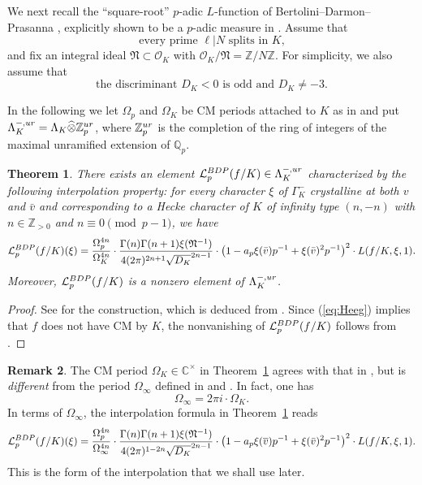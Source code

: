 \documentclass[a4paper,10pt]{amsart}
\numberwithin{equation}{section}
\numberwithin{equation}{section}
\theoremstyle{plain}
\newtheorem{thm}{Theorem}[subsection] %
\theoremstyle{definition}
\newtheorem{rmk}[thm]{Remark}
\theoremstyle{definition}
\theoremstyle{plain}
\theoremstyle{plain}
\theoremstyle{plain}
\theoremstyle{plain}
\newcommand{\Z}{\mathbb{Z}}
\newcommand{\Q}{\mathbb{Q}}
\newcommand{\C}{\mathbb{C}}
\newcommand{\Lcal}{\mathcal{L}}
\begin{document}
We next recall the ``square-root'' $p$-adic $L$-function of Bertolini--Darmon--Prasanna \cite{BDP}, explicitly shown to be a $p$-adic measure in \cite{cas-hsieh1}. Assume that 
\begin{equation}\label{eq:Heeg}
\textrm{every prime $\ell\vert N$ splits in $K$,}\tag{Heeg}
\end{equation}
and fix an integral ideal $\mathfrak{N}\subset\mathcal{O}_K$ with $\mathcal{O}_K/\mathfrak{N}=\Z/N\Z$.  For simplicity, we also assume that
\begin{equation}\label{eq:disc}
\textrm{the discriminant $D_K<0$ is odd and $D_K\neq -3$}.\tag{disc}
\end{equation}

In the following we let $\Omega_p$ and $\Omega_K$ be CM periods attached to $K$ as in \cite[\S{2.5}]{cas-hsieh1} and put  $\Lambda_{K}^{-,\rm ur}=\Lambda_K\widehat\otimes\Z_p^{\rm ur}$, where $\Z_p^{\rm ur}$ is the completion of the ring of integers of the maximal unramified extension of $\Q_p$.

\begin{thm}
\label{thm:BDP}
There exists an element $\Lcal_p^{\rm BDP}(f/K)\in\Lambda_K^{-,{\rm ur}}$ characterized by the following interpolation property: for every character $\xi$ of $\Gamma_K^-$ crystalline at both $v$ and $\bar{v}$ and corresponding to a Hecke character of $K$ of infinity type $(n,-n)$ with $n\in\Z_{>0}$ and $n\equiv 0\pmod{p-1}$, we have
\[
\Lcal_p^{\rm BDP}(f/K)(\xi)=\frac{\Omega_p^{4n}}{\Omega_K^{4n}}\cdot\frac{\Gamma(n)\Gamma(n+1)\xi(\mathfrak{N}^{-1})}{4(2\pi)^{2n+1}\sqrt{D_K}^{2n-1}}\cdot\bigl(1-a_p\xi(\bar{v})p^{-1}+\xi(\bar{v})^2p^{-1}\bigr)^2\cdot L(f/K,\xi,1).
\]  
Moreover, $\Lcal_p^{\rm BDP}(f/K)$ is a nonzero element of $\Lambda_K^{-,{\rm ur}}$.
\end{thm}

\begin{proof}
See \cite[Thm.~2.1.1]{eisenstein} for the construction, 
which is deduced from \cite[\S{3}]{cas-hsieh1}. Since (\ref{eq:Heeg}) implies that $f$ does not have CM by $K$, the nonvanishing of $\Lcal_p^{\rm BDP}(f/K)$ follows from \cite[Thm.~3.9]{cas-hsieh1}.
\end{proof}

\begin{rmk}\label{rem:periods}
The CM period $\Omega_{K}\in\C^\times$ in Theorem~\ref{thm:BDP} agrees with that in \cite[(5.1.16)]{BDP}, but is \emph{different} from the period $\Omega_\infty$ defined in \cite[p.\,66]{deshalit} and \cite[(4.4b)]{hidatilouineI}. In fact, one has 
\[
\Omega_{\infty}=2\pi i\cdot\Omega_K.
\]
In terms of $\Omega_\infty$, the interpolation formula in Theorem~\ref{thm:BDP} reads
\[
\Lcal_{p}^{\rm BDP}(f/K)(\xi)=\frac{\Omega_p^{4n}}{\Omega_\infty^{4n}}\cdot\frac{\Gamma(n)\Gamma(n+1)\xi(\mathfrak{N}^{-1})}{4(2\pi)^{1-2n}\sqrt{D_K}^{2n-1}}\cdot\bigl(1-a_p\xi(\overline{v})p^{-1}+\xi(\bar{v})^2p^{-1}\bigr)^2\cdot L(f/K,\xi,1).
\]
This is the form of the interpolation that we shall use later.
\end{rmk}
\end{document}
